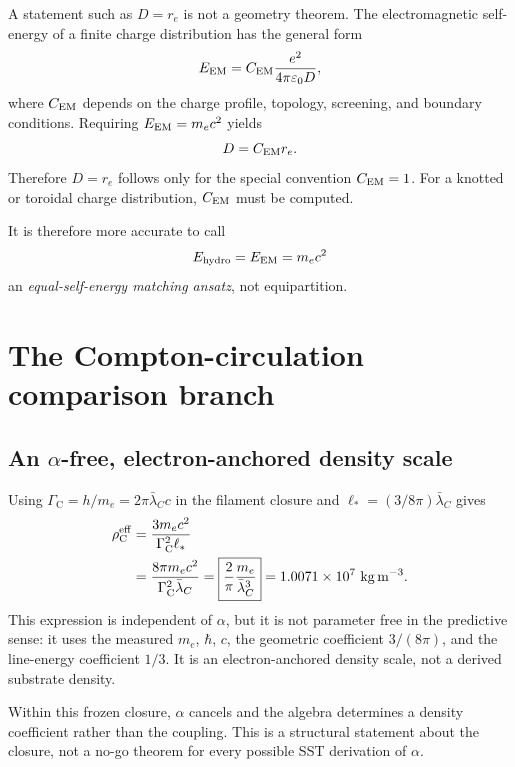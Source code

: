 \documentclass[aps,pre,preprint,notitlepage,nofootinbib,superscriptaddress]{revtex4-2}
\newcommand{\lC}{\bar\lambda_C}
\newcommand{\re}{r_e}
\newcommand{\rhoCeff}{\rho_{\mathrm C}^{\mathrm{eff}}}
\newcommand{\GammaC}{\Gamma_{\mathrm C}}
\begin{document}
A statement such as \(D=\re\) is not a geometry theorem.  The electromagnetic self-energy of a finite charge distribution has the general form
\begin{equation}
  E_{\rm EM}
  =
  C_{\rm EM}
  \frac{e^2}{4\pi\varepsilon_0D},
  \label{eq:EM-shape}
\end{equation}
where \(C_{\rm EM}\) depends on the charge profile, topology, screening, and boundary conditions.  Requiring \(E_{\rm EM}=m_ec^2\) yields
\begin{equation}
  D=C_{\rm EM}\re.
  \label{eq:shape-match}
\end{equation}
Therefore \(D=\re\) follows only for the special convention \(C_{\rm EM}=1\).  For a knotted or toroidal charge distribution, \(C_{\rm EM}\) must be computed.

It is therefore more accurate to call
\[
E_{\rm hydro}=E_{\rm EM}=m_ec^2
\]
an \emph{equal-self-energy matching ansatz}, not equipartition.

\section{The Compton-circulation comparison branch}
\label{sec:compton-branch}

\subsection{An \texorpdfstring{\(\alpha\)-free}{alpha-free}, electron-anchored density scale}

Using \(\GammaC=h/m_e=2\pi\lC c\) in the filament closure and
\(\ell_*=(3/8\pi)\lC\) gives
\begin{align}
  \rhoCeff
  &=
  \frac{3m_ec^2}{\GammaC^2\ell_*}
  \notag\\
  &=
  \frac{8\pi m_ec^2}{\GammaC^2\lC}
  =
  \boxed{
  \frac{2}{\pi}\frac{m_e}{\lC^3}
  }
  =
  1.0071\times10^7\ \mathrm{kg\,m^{-3}}.
  \label{eq:rhoC}
\end{align}
This expression is independent of \(\alpha\), but it is not parameter free in the predictive sense: it uses the measured \(m_e\), \(\hbar\), \(c\), the geometric coefficient \(3/(8\pi)\), and the line-energy coefficient \(1/3\).  It is an electron-anchored density scale, not a derived substrate density.

Within this frozen closure, \(\alpha\) cancels and the algebra determines a density coefficient rather than the coupling.  This is a structural statement about the closure, not a no-go theorem for every possible SST derivation of \(\alpha\).
\end{document}
